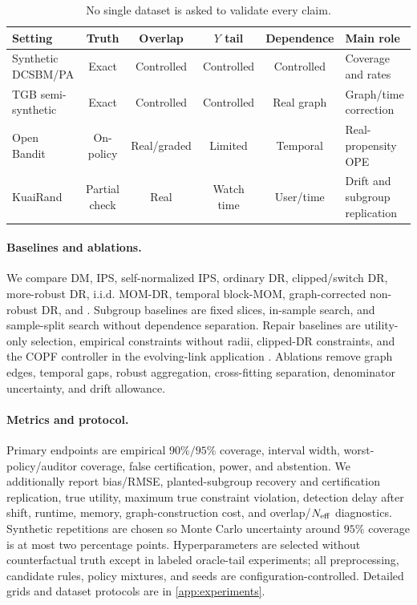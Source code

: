 \begin{table}[t]
\centering\small
\setlength{\tabcolsep}{3pt}
\begin{tabularx}{\linewidth}{@{}lccccX@{}}
\toprule
Setting & Truth & Overlap & $Y$ tail & Dependence & Main role \\
\midrule
Synthetic DCSBM/PA & Exact & Controlled & Controlled & Controlled & Coverage and rates \\
TGB semi-synthetic & Exact & Controlled & Controlled & Real graph & Graph/time correction \\
Open Bandit & On-policy & Real/graded & Limited & Temporal & Real-propensity OPE \\
KuaiRand & Partial check & Real & Watch time & User/time & Drift and subgroup replication \\
\bottomrule
\end{tabularx}
\caption{No single dataset is asked to validate every claim.}
\label{tab:datasets}
\end{table}

\paragraph{Baselines and ablations.}
We compare DM, IPS, self-normalized IPS, ordinary DR, clipped/switch DR, more-robust DR, i.i.d. MOM-DR, temporal block-MOM, graph-corrected non-robust DR, and \COMET. Subgroup baselines are fixed slices, in-sample search, and sample-split search without dependence separation. Repair baselines are utility-only selection, empirical constraints without radii, clipped-DR constraints, and the COPF controller in the evolving-link application \citep{li2026copf}. Ablations remove graph edges, temporal gaps, robust aggregation, cross-fitting separation, denominator uncertainty, and drift allowance.

\paragraph{Metrics and protocol.}
Primary endpoints are empirical $90\%/95\%$ coverage, interval width, worst-policy/auditor coverage, false certification, power, and abstention. We additionally report bias/RMSE, planted-subgroup recovery and certification replication, true utility, maximum true constraint violation, detection delay after shift, runtime, memory, graph-construction cost, and overlap/$N_{\mathrm{eff}}$ diagnostics. Synthetic repetitions are chosen so Monte Carlo uncertainty around $95\%$ coverage is at most two percentage points. Hyperparameters are selected without counterfactual truth except in labeled oracle-tail experiments; all preprocessing, candidate rules, policy mixtures, and seeds are configuration-controlled. Detailed grids and dataset protocols are in \cref{app:experiments}.

